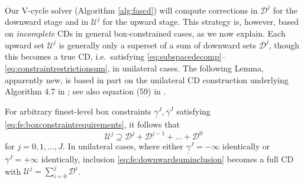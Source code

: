 \documentclass[review,hidelinks,onefignum,onetabnum]{siamart220329}
\begin{document}
Our V-cycle solver (Algorithm \ref{alg:fascd}) will compute corrections in $\mathcal{D}^j$ for the downward stage and in $\mathcal{U}^j$ for the upward stage. This strategy is, however, based on \emph{incomplete} CDs in general box-constrained cases, as we now explain.  Each upward set $\mathcal{U}^j$ is generally only a superset of a sum of downward sets $\mathcal{D}^j$, though this becomes a true CD, i.e.~satisfying \eqref{eq:subspacedecomp}--\eqref{eq:constraintrestrictionsum}, in unilateral cases.  The following Lemma, apparently new, is based in part on the unilateral CD construction underlying Algorithm 4.7 in \cite{GraeserKornhuber2009}; see also equation (59) in \cite{Tai2003}.

\begin{lemma}  \label{lem:downwardadmissibility}  For arbitrary finest-level box constraints $\underline{\gamma}^J,\overline{\gamma}^J$ satisfying \eqref{eq:fe:boxconstraintrequirements}, it follows that
\begin{equation}
\mathcal{U}^j \supseteq \mathcal{D}^j + \mathcal{D}^{j-1} + \dots + \mathcal{D}^0 \label{eq:fe:downwardsuminclusion}
\end{equation}
for $j=0,1,\dots,J$.  In unilateral cases, where either $\underline{\gamma}^J=-\infty$ identically or $\overline{\gamma}^J=+\infty$ identically, inclusion \eqref{eq:fe:downwardsuminclusion} becomes a full CD with $\mathcal{U}^j=\sum_{i=0}^j \mathcal{D}^i$.
\end{lemma}
\end{document}
